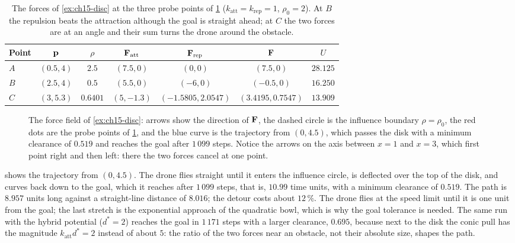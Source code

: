 \begin{table}[tb]
  \centering\small
  \caption{The forces of \cref{ex:ch15-disc} at the three probe points of
  \cref{fig:ch15-field} ($k_{\mathrm{att}} = k_{\mathrm{rep}} = 1$, $\rho_0 =
  2$). At $B$ the repulsion beats the attraction although the goal is straight
  ahead; at $C$ the two forces are at an angle and their sum turns the drone
  around the obstacle.}
  \label{tab:ch15-forces}
  \begin{tabular}{@{}lcccccc@{}}
  \toprule
  Point & $\mathbf{p}$ & $\rho$ & $\mathbf{F}_{\mathrm{att}}$ & $\mathbf{F}_{\mathrm{rep}}$ & $\mathbf{F}$ & $U$\\
  \midrule
  $A$ & $(0.5, 4)$ & $2.5$    & $(7.5, 0)$   & $(0, 0)$            & $(7.5, 0)$          & $28.125$\\
  $B$ & $(2.5, 4)$ & $0.5$    & $(5.5, 0)$   & $(-6, 0)$           & $(-0.5, 0)$         & $16.250$\\
  $C$ & $(3, 5.3)$ & $0.6401$ & $(5, -1.3)$  & $(-1.5805, 2.0547)$ & $(3.4195, 0.7547)$  & $13.909$\\
  \bottomrule
  \end{tabular}
\end{table}

\begin{figure}[tb]
  \centering
  \caption{The force field of \cref{ex:ch15-disc}: arrows show the direction
  of $\mathbf{F}$, the dashed circle is the influence boundary $\rho = \rho_0$,
  the red dots are the probe points of \cref{tab:ch15-forces}, and the blue
  curve is the trajectory from $(0, 4.5)$, which passes the disk with a
  minimum clearance of $0.519$ and reaches the goal after $1\,099$ steps.
  Notice the arrows on the axis between $x = 1$ and $x = 3$, which first
  point right and then left: there the two forces cancel at one point.}
  \label{fig:ch15-field}
\end{figure}

 shows the trajectory from $(0, 4.5)$. The drone flies
straight until it enters the influence circle, is deflected over the top of
the disk, and curves back down to the goal, which it reaches after $1\,099$
steps, that is, $10.99$ time units, with a minimum clearance of $0.519$. The
path is $8.957$ units long against a straight-line distance of $8.016$; the
detour costs about $12\,\%$. The drone flies at the speed limit until it is
one unit from the goal; the last stretch is the exponential approach of the
quadratic bowl, which is why the goal tolerance is needed. The same run with the hybrid potential
($d^* = 2$) reaches the goal in $1\,171$ steps with a larger clearance,
$0.695$, because next to the disk the conic pull has the magnitude
$k_{\mathrm{att}} d^* = 2$ instead of about $5$: the ratio of the two forces
near an obstacle, not their absolute size, shapes the path.

